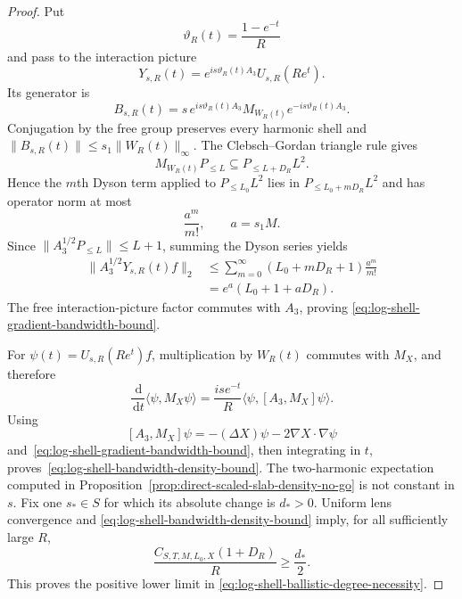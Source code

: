 \documentclass[11pt]{article}
\theoremstyle{remark}
\newcommand{\dd}{\,\mathrm d}
\begin{document}
\begin{proof}
Put
\[
 \vartheta_R(t)=\frac{1-e^{-t}}{R}
\]
and pass to the interaction picture
\[
 Y_{s,R}(t)=e^{is\vartheta_R(t)A_3}U_{s,R}(Re^t).
\]
Its generator is
\[
 B_{s,R}(t)
 =
 s\,e^{is\vartheta_R(t)A_3}
 M_{W_R(t)}
 e^{-is\vartheta_R(t)A_3}.
\]
Conjugation by the free group preserves every harmonic shell and
$\|B_{s,R}(t)\|\leq s_1\|W_R(t)\|_\infty$.  The
Clebsch--Gordan triangle rule gives
\[
 M_{W_R(t)}P_{\leq L}\subseteq P_{\leq L+D_R}L^2.
\]
Hence the $m$th Dyson term applied to $P_{\leq L_0}L^2$ lies in
$P_{\leq L_0+mD_R}L^2$ and has operator norm at most
\[
 \frac{a^m}{m!},
 \qquad a=s_1M.
\]
Since $\|A_3^{1/2}P_{\leq L}\|\leq L+1$, summing the Dyson series yields
\begin{align*}
 \|A_3^{1/2}Y_{s,R}(t)f\|_2
 &\leq
 \sum_{m=0}^\infty
 (L_0+mD_R+1)\frac{a^m}{m!}\\
 &=
 e^a(L_0+1+aD_R).
\end{align*}
The free interaction-picture factor commutes with $A_3$, proving
\eqref{eq:log-shell-gradient-bandwidth-bound}.

For $\psi(t)=U_{s,R}(Re^t)f$, multiplication by $W_R(t)$ commutes with
$M_X$, and therefore
\[
 \frac{\dd}{\dd t}\langle\psi,M_X\psi\rangle
 =
 \frac{is e^{-t}}R\langle\psi,[A_3,M_X]\psi\rangle.
\]
Using
\[
 [A_3,M_X]\psi
 =
 -(\Delta X)\psi-2\nabla X\cdot\nabla\psi
\]
and~\eqref{eq:log-shell-gradient-bandwidth-bound}, then integrating in
$t$, proves~\eqref{eq:log-shell-bandwidth-density-bound}.  The
two-harmonic expectation computed in
Proposition~\ref{prop:direct-scaled-slab-density-no-go} is not constant in
$s$.  Fix one $s_\ast\in S$ for which its absolute change is $d_\ast>0$.
Uniform lens convergence and
\eqref{eq:log-shell-bandwidth-density-bound} imply, for all sufficiently
large $R$,
\[
 \frac{C_{S,T,M,L_0,X}(1+D_R)}R\geq\frac{d_\ast}{2}.
\]
This proves the positive lower limit in
\eqref{eq:log-shell-ballistic-degree-necessity}.
\end{proof}
\end{document}
